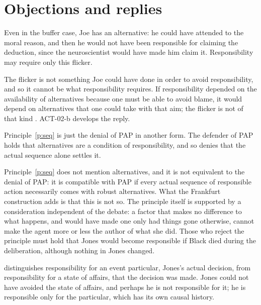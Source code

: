 \documentclass{situationist-preprint}
\begin{document}
\section{Objections and replies}

\begin{objection}
Even in the buffer case, Joe has an alternative: he could have attended to the moral reason, and then he would not have been responsible for claiming the deduction, since the neuroscientist would have made him claim it. Responsibility may require only this flicker.
\end{objection}

\begin{reply}
The flicker is not something Joe could have done in order to avoid responsibility, and so it cannot be what responsibility requires. If responsibility depended on the availability of alternatives because one must be able to avoid blame, it would depend on alternatives that one could take with that aim; the flicker is not of that kind \citep{Fischer1994}. ACT-02-b develops the reply.
\end{reply}

\begin{objection}
Principle~\ref{p:seq} is just the denial of PAP in another form. The defender of PAP holds that alternatives are a condition of responsibility, and so denies that the actual sequence alone settles it.
\end{objection}

\begin{reply}
Principle~\ref{p:seq} does not mention alternatives, and it is not equivalent to the denial of PAP: it is compatible with PAP if every actual sequence of responsible action necessarily comes with robust alternatives. What the Frankfurt construction adds is that this is not so. The principle itself is supported by a consideration independent of the debate: a factor that makes no difference to what happens, and would have made one only had things gone otherwise, cannot make the agent more or less the author of what she did. Those who reject the principle must hold that Jones would become responsible if Black died during the deliberation, although nothing in Jones changed.
\end{reply}

\begin{objection}
\citet{vanInwagen1978} distinguishes responsibility for an event particular, Jones's actual decision, from responsibility for a state of affairs, that the decision was made. Jones could not have avoided the state of affairs, and perhaps he is not responsible for it; he is responsible only for the particular, which has its own causal history.
\end{objection}
\end{document}

